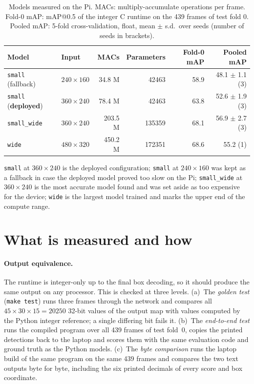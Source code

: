 \documentclass[11pt,a4paper]{article}
\newcommand{\cfg}[1]{\texttt{#1}}
\begin{document}
\begin{table}[h]
\centering
\caption{Models measured on the Pi. MACs: multiply-accumulate operations per
frame. Fold-0 mAP: mAP@0.5 of the integer C runtime on the 439 frames of test
fold 0. Pooled mAP: 5-fold cross-validation, float, mean $\pm$ s.d.\ over
seeds (number of seeds in brackets).}
\label{tab:models}
\begin{tabular}{llrrrr}
\toprule
Model & Input & MACs & Parameters & Fold-0 mAP & Pooled mAP \\
\midrule
\cfg{small} (fallback) & $240 \times 160$ & 34.8 M & \num{42463} & 58.9 & 48.1 $\pm$ 1.1 (3) \\
\cfg{small} (\textbf{deployed}) & $360 \times 240$ & 78.4 M & \num{42463} & 63.8 & 52.6 $\pm$ 1.9 (3) \\
\cfg{small\_wide} & $360 \times 240$ & 203.5 M & \num{135359} & 68.1 & 56.9 $\pm$ 2.7 (3) \\
\cfg{wide} & $480 \times 320$ & 450.2 M & \num{172351} & 68.6 & 55.2 (1) \\
\bottomrule
\end{tabular}
\end{table}

\cfg{small} at $360 \times 240$ is the deployed configuration;
\cfg{small} at $240 \times 160$ was kept as a fallback in case the deployed
model proved too slow on the Pi; \cfg{small\_wide} at $360 \times 240$ is
the most accurate model found and was set aside as too expensive for the
device; \cfg{wide} is the largest model trained and marks the upper end of
the compute range.

\section{What is measured and how}
\label{sec:method}

\paragraph{Output equivalence.} The runtime is integer-only up to the final
box decoding, so it should produce the same output on any processor. This is
checked at three levels. (a)~The \emph{golden test} (\texttt{make test})
runs three frames through the network and compares all $45 \times 30 \times
15 = \num{20250}$ 32-bit values of the output map with values computed by the
Python integer reference; a single differing bit fails it. (b)~The
\emph{end-to-end test} runs the compiled program over all 439 frames of test
fold~0, copies the printed detections back to the laptop and scores them
with the same evaluation code and ground truth as the Python models. (c)~The
\emph{byte comparison} runs the laptop build of the same program on the same
439 frames and compares the two text outputs byte for byte, including the
six printed decimals of every score and box coordinate.
\end{document}
